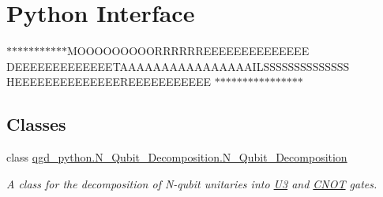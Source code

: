 \hypertarget{group__python}{}\section{Python Interface}
\label{group__python}


$\ast$$\ast$$\ast$$\ast$$\ast$$\ast$$\ast$$\ast$$\ast$$\ast$$\ast$\+M\+O\+O\+O\+O\+O\+O\+O\+O\+O\+R\+R\+R\+R\+R\+R\+E\+E\+E\+E\+E\+E\+E\+E\+E\+E\+E\+E\+EE D\+E\+E\+E\+E\+E\+E\+E\+E\+E\+E\+E\+E\+E\+T\+A\+A\+A\+A\+A\+A\+A\+A\+A\+A\+A\+A\+A\+A\+A\+A\+I\+L\+S\+S\+S\+S\+S\+S\+S\+S\+S\+S\+S\+S\+SS H\+E\+E\+E\+E\+E\+E\+E\+E\+E\+E\+E\+E\+E\+E\+R\+E\+E\+E\+E\+E\+E\+E\+E\+E\+EE $\ast$$\ast$$\ast$$\ast$$\ast$$\ast$$\ast$$\ast$$\ast$$\ast$$\ast$$\ast$$\ast$$\ast$$\ast$$\ast$  


\subsection*{Classes}
\begin{DoxyCompactItemize}
\item 
class \hyperlink{classqgd__python_1_1_n___qubit___decomposition_1_1_n___qubit___decomposition}{qgd\+\_\+python.\+N\+\_\+\+Qubit\+\_\+\+Decomposition.\+N\+\_\+\+Qubit\+\_\+\+Decomposition}
\begin{DoxyCompactList}\small\item\em A class for the decomposition of N-\/qubit unitaries into \hyperlink{class_u3}{U3} and \hyperlink{class_c_n_o_t}{C\+N\+OT} gates. \end{DoxyCompactList}\end{DoxyCompactItemize}
